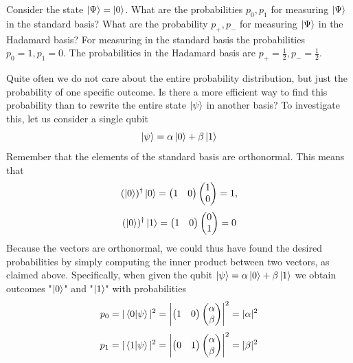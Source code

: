 \begin{example}
    Consider the state $\ket{\Psi}=\ket{0}$. What are the probabilities  $p_0,p_1$ for measuring $\ket{\Psi}$ in the standard basis? What are the probability $p_{+},p_{-}$ for measuring $\ket{\Psi}$ in the Hadamard basis?
    For measuring in the standard basis the probabilities $p_0=1, p_1=0$. The probabilities in the Hadamard basis are $p_+=\frac{1}{2},p_-=\frac{1}{2}$.
\end{example}

Quite often we do not care about the entire probability distribution, but just the probability of one
specific outcome. Is there a more efficient way to find this probability than to rewrite the entire
state $\ket{\psi}$ in another basis? To investigate this, let us consider a single qubit
\[
\ket{\psi}=\alpha\ket{0}+\beta\ket{1}
\]
Remember that the elements of the standard basis are orthonormal. This means that
\[
(\ket{0})^{\dagger}\ket{0}=\begin{pmatrix} 1 & 0 \end{pmatrix}\begin{pmatrix} 1 \\ 0 \end{pmatrix} = 1,
\]
\[
(\ket{0})^{\dagger}\ket{1}=\begin{pmatrix} 1 & 0 \end{pmatrix}\begin{pmatrix} 0 \\ 1 \end{pmatrix} = 0
\]
Because the vectors are orthonormal, we could thus have found the desired probabilities by simply
computing the inner product between two vectors, as claimed above. Specifically, when given the qubit $\ket{\psi}=\alpha\ket{0}+\beta\ket{1}$ we obtain outcomes "$\ket{0}$" and "$\ket{1}$" with probabilities
\[
p_0=|\braket{0|\psi}|^2=\begin{vmatrix}\begin{pmatrix} 1 & 0 \end{pmatrix} \begin{pmatrix}\alpha \\ \beta \end{pmatrix}  \end{vmatrix}^2=|\alpha|^2
\]
\[
p_1=|\braket{1|\psi}|^2=\begin{vmatrix} \begin{pmatrix} 0 & 1 \end{pmatrix}\begin{pmatrix}\alpha \\ \beta \end{pmatrix}  \end{vmatrix}^2=|\beta|^2
\]

